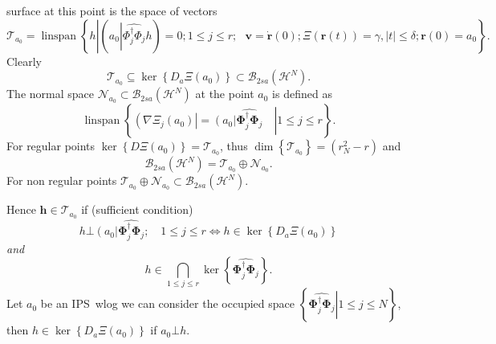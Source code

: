 \documentclass[aps,preprint]{revtex4}%
\begin{document}
surface at this point is the space of vectors
\begin{equation}
\mathcal{T}_{a_{0}}=\operatorname{linspan}\left\{  h\left\vert \left(
a_{0}\left\vert \widehat{\Phi_{j}^{\dagger}\Phi_{j}}\right.  h\right)
=0\right.  ;1\leq j\leq r;\text{ }\mathbf{v=\dot{r}}\left(  0\right)
;\Xi\left(  \mathbf{r}\left(  t\right)  \right)  =\gamma,\left\vert
t\right\vert \leq\delta;\mathbf{r}\left(  0\right)  =a_{0}\right\}  .
\end{equation}
Clearly
\begin{equation}
\mathcal{T}_{a_{0}}\subseteq\ker\left\{  D_{a}\Xi\left(  a_{0}\right)
\right\}  \subset\mathcal{B}_{2sa}\left(  \mathcal{H}^{N}\right)  .
\end{equation}
The normal space $\mathcal{N}_{a_{0}}\subset\mathcal{B}_{2sa}\left(
\mathcal{H}^{N}\right)  $ at the point $a_{0}$ is defined as
\begin{equation}
\operatorname{linspan}\left\{  \left.  \left(  \overset{}{\nabla\Xi_{j}\left(
a_{0}\right)  }\right\vert =\left(  \overset{}{a_{0}}\right\vert
\widehat{\mathbf{\Phi}_{j}^{\dagger}\mathbf{\Phi}_{j}}\quad\right\vert 1\leq
j\leq r\right\}  .
\end{equation}
For regular points $\ker\left\{  D\Xi\left(  a_{0}\right)  \right\}
=\mathcal{T}_{a_{0}}$, thus $\dim\left\{  \mathcal{T}_{a_{0}}\right\}
=\left(  r_{N}^{2}-r\right)  $ and
\begin{equation}
\mathcal{B}_{2sa}\left(  \mathcal{H}^{N}\right)  =\mathcal{T}_{a_{0}}%
\oplus\mathcal{N}_{a_{0}}.
\end{equation}
For non regular points $\mathcal{T}_{a_{0}}\oplus\mathcal{N}_{a_{0}}%
\subset\mathcal{B}_{2sa}\left(  \mathcal{H}^{N}\right)  .$

Hence $\mathbf{h\in}\mathcal{T}_{a_{0}}$ if (sufficient condition)
\begin{equation}
h\mathbf{\bot}\left(  a_{0}\right\vert \widehat{\mathbf{\Phi}_{j}^{\dagger
}\mathbf{\Phi}_{j}};\quad1\leq j\leq r\Leftrightarrow h\in\ker\left\{
D_{a}\Xi\left(  a_{0}\right)  \right\}
\end{equation}
\emph{and}
\begin{equation}
h\in\bigcap\limits_{1\leq j\leq r}\ker\left\{  \widehat{\mathbf{\Phi}%
_{j}^{\dagger}\mathbf{\Phi}_{j}}\right\}  .
\end{equation}
Let $a_{0}$ be an IPS\ wlog we can consider the occupied space $\left\{
\left.  \widehat{\mathbf{\Phi}_{j}^{\dagger}\mathbf{\Phi}_{j}}\right\vert
1\leq j\leq N\right\}  $, then $h\in\ker\left\{  D_{a}\Xi\left(  a_{0}\right)
\right\}  $ if $a_{0}\mathbf{\bot}h$.
\end{document}
